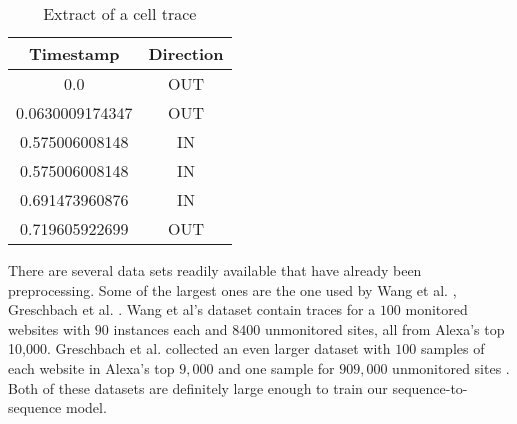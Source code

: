 \begin{table}[ht]
\centering
  \begin{tabular}{ c | c }
    \textbf{Timestamp} & \textbf{Direction} \\ \hline
      0.0&OUT \\
      0.0630009174347&OUT \\
      0.575006008148&IN \\
      0.575006008148&IN \\
      0.691473960876&IN \\
      0.719605922699&OUT \\
  \end{tabular}
  \caption{Extract of a cell trace \cite{greschbach2016effect}}
  \label{table:cell-extract}
\end{table}

There are several data sets readily available that have already been preprocessing.
Some of the largest ones are the one used by Wang et al. \cite{wang_cai_johnson_nithyanand_goldberg_2014}, Greschbach et al. \cite{greschbach2016effect}.
Wang et al's dataset contain traces for a $100$ monitored websites with $90$ instances each and $8400$ unmonitored sites, all from Alexa's top 10,000.
Greschbach et al. collected an even larger dataset with $100$ samples of each website in Alexa's top $9,000$ and one sample for $909,000$ unmonitored sites \cite{greschbach2016effect}.
Both of these datasets are definitely large enough to train our sequence-to-sequence model.
